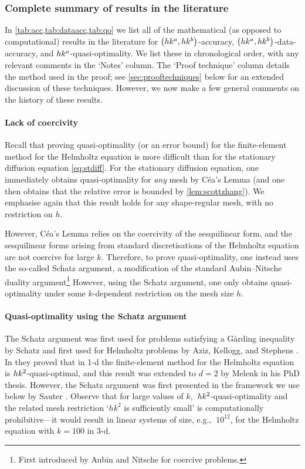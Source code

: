 \subsubsection{Complete summary of results in the literature}

In \cref{tab:acc,tab:dataacc,tab:qo} we list all of the mathematical (as opposed to computational) results in the literature for $\hk{a}b$-accuracy, $\hk{a}b$-data-accuracy, and $hk^{a}$-quasi-optimality. We list these in chronological order, with any relevant comments in the `Notes' column. The `Proof technique' column details the method used in the proof; see \cref{sec:prooftechniques} below for an extended discussion of these techniques. However, we now make a few general comments on the history of these results.

\paragraph{Lack of coercivity} Recall that proving quasi-optimality (or an error bound) for the finite-element method for the Helmholtz equation is more difficult than for the stationary diffusion equation \cref{eq:stdiff}. For the stationary diffusion equation, one immediately obtains quasi-optimality for \emph{any} mesh by C\'ea's Lemma (and one then obtains that the relative error is bounded by \cref{lem:scottzhang}). We emphasise again that this result holds for any shape-regular mesh, with no restriction on $h.$

However, C\'ea's Lemma relies on the coercivity of the sesquilinear form, and the sesquilinear forms arising from standard discretisations of the Helmholtz equation are not coercive for large $k$. Therefore, to prove quasi-optimality, one instead uses the so-called Schatz argument, a modification of the standard Aubin--Nitsche duality argument\footnote{First introduced by Aubin \cite{Au:67} and Nitsche \cite{Ni:68} for coercive problems.} However, using the Schatz argument, one only obtains quasi-optimality under some $k$-dependent restriction on the mesh size $h.$

\paragraph{Quasi-optimality using the Schatz argument} The Schatz argument was first used for problems satisfying a G\r{a}rding inequality by Schatz \cite{Sc:74} and first used for Helmholtz problems by Aziz, Kellogg, and Stephens \cite{AzKeSt:88}. In \cite{AzKeSt:88} they proved that in 1-d the finite-element method for the Helmholtz equation is $hk^{2}$-quasi-optimal, and this result was extended to $d=2$ by Melenk \cite{Me:95} in his PhD thesis. However, the Schatz argument was first presented in the framework we use below by Sauter \cite[Section 2]{Sa:06}. Observe that for large values of $k,$ $hk^{2}$-quasi-optimality and the related mesh restriction `$hk^2$ is sufficiently small' is computationally prohibitive---it would result in linear systems of size, e.g., $~10^{12}$, for the Helmholtz equation with $k=100$ in 3-d.

